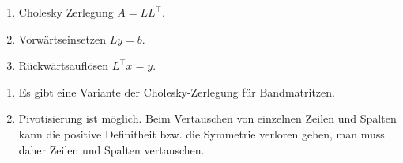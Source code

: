 \begin{enumerate}[label=\arabic{*}. Schritt]
  \item Cholesky Zerlegung $A=LL^\top$.
  \item Vorwärtseinsetzen $Ly = b$.
  \item Rückwärtsauflösen $L^\top x = y$. 
\end{enumerate}

\begin{bemn}[Bemerkungen.]
\begin{enumerate}[label=\arabic{*}.)]
  \item Es gibt eine Variante der Cholesky-Zerlegung für Bandmatritzen.
  \item Pivotisierung ist möglich. Beim Vertauschen von einzelnen Zeilen und
  Spalten kann die positive Definitheit bzw. die Symmetrie verloren gehen, man
  muss daher Zeilen und Spalten vertauschen.\maphere
\end{enumerate}
\end{bemn}